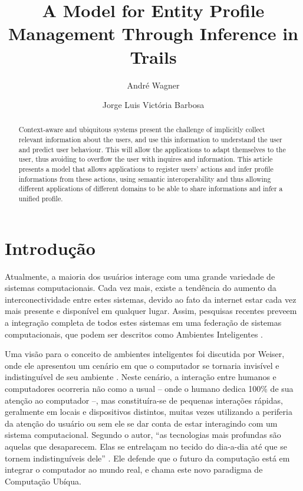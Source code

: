 \documentclass[times, 10pt, twocolumn]{article}
\begin{document}
\title{A Model for Entity Profile Management Through Inference in Trails}

\author{André Wagner}
\author{Jorge Luis Victória Barbosa}

\maketitle
\thispagestyle{empty}

\begin{abstract}
Context-aware and ubiquitous systems present the challenge of implicitly collect relevant information about the users, and use this information to understand the user and predict user behaviour. This will allow the applications to adapt themselves to the user, thus avoiding to overflow the user with inquires and information. This article presents a model that allows applications to register users' actions and infer profile informations from these actions, using semantic interoperability and thus allowing different applications of different domains to be able to share informations and infer a unified profile.
\end{abstract}

\section{Introdução}
\label{ch:introducao}

Atualmente, a maioria dos usuários interage com uma grande variedade de sistemas computacionais. Cada vez mais, existe a tendência do aumento da interconectividade entre estes sistemas, devido ao fato da internet estar cada vez mais presente e disponível em qualquer lugar. Assim, pesquisas recentes preveem a integração completa de todos estes sistemas em uma federação de sistemas computacionais, que podem ser descritos como Ambientes Inteligentes \cite{heckmann05}.

Uma visão para o conceito de ambientes inteligentes foi discutida por Weiser, onde ele apresentou um cenário em que o computador se tornaria invisível e indistinguível de seu ambiente \cite{weiser91}. Neste cenário, a interação entre humanos e computadores ocorreria não como a usual -- onde o humano dedica 100\% de sua atenção ao computador --, mas constituíra-se de pequenas interações rápidas, geralmente em locais e dispositivos distintos, muitas vezes utilizando a periferia da atenção do usuário \cite{weiser96} ou sem ele se dar conta de estar interagindo com um sistema computacional. Segundo o autor, ``as tecnologias mais profundas são aquelas que desaparecem. Elas se entrelaçam no tecido do dia-a-dia até que se tornem indistinguíveis dele'' \cite{weiser91}. Ele defende que o futuro da computação está em integrar o computador ao mundo real, e chama este novo paradigma de Computação Ubíqua.
\end{document}
